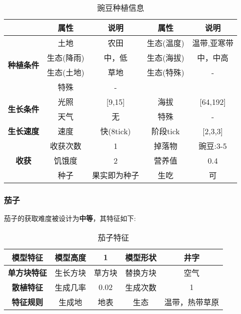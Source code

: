 \begin{table}[H]
    \centering
    \caption{豌豆种植信息}
    \label{table:豌豆种植信息}
    \setlength{\tabcolsep}{4mm}
    \begin{tabular}{c|cc|cc}
        \toprule
                                           & \textbf{属性} & \textbf{说明} & \textbf{属性} & \textbf{说明} \\
        \midrule
        \multirow{4}{*}{\textbf{种植条件}} & 土地          & 农田          & 生态(温度)    & 温带,亚寒带    \\
                                           & 生态(降雨)    & 中，低        & 生态(海拔)    & 中，中高            \\
                                           & 生态(土地)    & 草地          & 生态(特殊)    & -             \\
                                           & 特殊          & -                                             \\
        \midrule
        \multirow{2}{*}{\textbf{生长条件}} & 光照          & [9,15]        & 海拔          & [64,192]      \\
                                           & 天气          & 无            & 特殊          & -             \\
        \midrule
        \textbf{生长速度}                  & 速度          & 快(8tick)     & 阶段tick      & [2,3,3]       \\
        \midrule
        \multirow{3}{*}{\textbf{收获}}     & 收获次数      & 1             & 掉落物        & 豌豆:3-5      \\
                                           & 饥饿度        & 2             & 营养值        & 0.4           \\
                                           & 种子          & 果实即为种子  & 生吃          & 可   \\
        \bottomrule
    \end{tabular}
\end{table}

\subsubsection{茄子}

茄子的获取难度被设计为\textbf{中等}，其特征如下:
\begin{table}[H]
    \centering
    \caption{茄子特征}
    \label{table:茄子特征}
    \setlength{\tabcolsep}{4mm}
    \begin{tabular}{c|cc|cc}
        \toprule
        \textbf{模型特征}   & 模型高度 & 1      & 模型形状 & 井字     \\
        \midrule
        \textbf{单方块特征} & 生长方块 & 草方块 & 替换方块 & 空气     \\
        \midrule
        \textbf{散植特征}   & 生成几率 & 0.02   & 生成次数 & 1        \\
        \midrule
        \textbf{特征规则}   & 生成地   & 地表   & 生态     & 温带，热带草原 \\
        \bottomrule
    \end{tabular}
\end{table}


